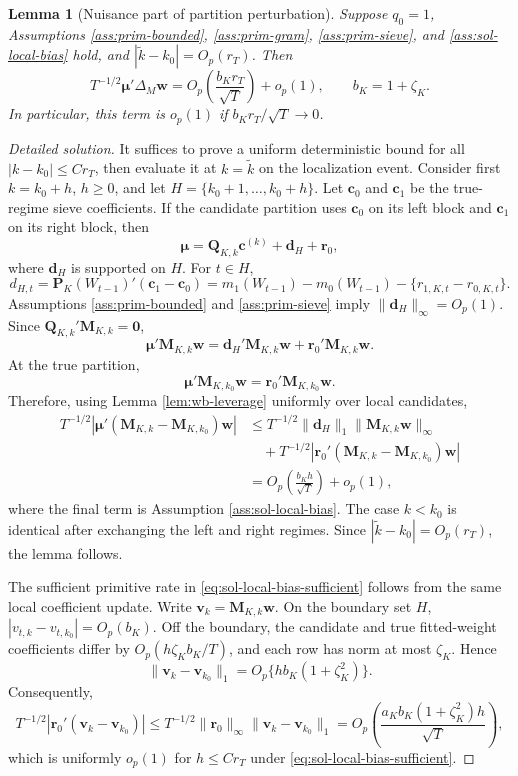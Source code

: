 \documentclass[12pt]{article}
\numberwithin{equation}{section}
\newtheorem{lemma}{Lemma}
\theoremstyle{definition}
\begin{document}
\begin{lemma}[Nuisance part of partition perturbation]
\label{lem:wb-bridge-mu}
Suppose \(q_0=1\), Assumptions \ref{ass:prim-bounded},
\ref{ass:prim-gram}, \ref{ass:prim-sieve}, and
\ref{ass:sol-local-bias} hold, and \(|\widetilde k-k_0|=O_p(r_T)\).  Then
\[
    T^{-1/2}\bm\mu'\Delta_M\bm w
    =
    O_p\!\left(\frac{b_Kr_T}{\sqrt T}\right)+o_p(1),
    \qquad b_K=1+\zeta_K.
\]
In particular, this term is \(o_p(1)\) if \(b_Kr_T/\sqrt T\to0\).
\end{lemma}


\begin{proof}[Detailed solution]
It suffices to prove a uniform deterministic bound for all
\(|k-k_0|\leq Cr_T\), then evaluate it at \(k=\widetilde k\) on the
localization event.  Consider first \(k=k_0+h\), \(h\geq0\), and let
\(H=\{k_0+1,\ldots,k_0+h\}\).  Let \(\bm c_0\) and \(\bm c_1\) be
the true-regime sieve coefficients.  If the candidate partition uses
\(\bm c_0\) on its left block and \(\bm c_1\) on its right block, then
\[
    \bm\mu=\bm Q_{K,k}\bm c^{(k)}+\bm d_H+\bm r_0,
\]
where \(\bm d_H\) is supported on \(H\).  For \(t\in H\),
\[
    d_{H,t}
    =\bm P_K(W_{t-1})'(\bm c_1-\bm c_0)
    =m_1(W_{t-1})-m_0(W_{t-1})-
      \{r_{1,K,t}-r_{0,K,t}\}.
\]
Assumptions \ref{ass:prim-bounded} and \ref{ass:prim-sieve} imply
\(\|\bm d_H\|_\infty=O_p(1)\).  Since
\(\bm Q_{K,k}'\bm M_{K,k}=\bm0\),
\[
    \bm\mu'\bm M_{K,k}\bm w
    =\bm d_H'\bm M_{K,k}\bm w
      +\bm r_0'\bm M_{K,k}\bm w.
\]
At the true partition,
\[
    \bm\mu'\bm M_{K,k_0}\bm w
    =\bm r_0'\bm M_{K,k_0}\bm w.
\]
Therefore, using Lemma \ref{lem:wb-leverage} uniformly over local candidates,
\begin{align*}
    T^{-1/2}|\bm\mu'(\bm M_{K,k}-\bm M_{K,k_0})\bm w|
    &\leq
      T^{-1/2}\|\bm d_H\|_1\|\bm M_{K,k}\bm w\|_\infty \\
    &\quad+
      T^{-1/2}|\bm r_0'(\bm M_{K,k}-\bm M_{K,k_0})\bm w| \\
    &=O_p\left(\frac{b_Kh}{\sqrt T}\right)+o_p(1),
\end{align*}
where the final term is Assumption \ref{ass:sol-local-bias}.  The case
\(k<k_0\) is identical after exchanging the left and right regimes.  Since
\(|\widetilde k-k_0|=O_p(r_T)\), the lemma follows.

The sufficient primitive rate in \eqref{eq:sol-local-bias-sufficient} follows
from the same local coefficient update.  Write \(\bm v_k=\bm M_{K,k}\bm w\).
On the boundary set \(H\), \(|v_{t,k}-v_{t,k_0}|=O_p(b_K)\).  Off the
boundary, the candidate and true fitted-weight coefficients differ by
\(O_p(h\zeta_Kb_K/T)\), and each row has norm at most \(\zeta_K\).  Hence
\[
    \|\bm v_k-\bm v_{k_0}\|_1
    =O_p\{h b_K(1+\zeta_K^2)\}.
\]
Consequently,
\[
    T^{-1/2}|\bm r_0'(\bm v_k-\bm v_{k_0})|
    \leq T^{-1/2}\|\bm r_0\|_\infty
       \|\bm v_k-\bm v_{k_0}\|_1
    =O_p\left(
       \frac{a_Kb_K(1+\zeta_K^2)h}{\sqrt T}
      \right),
\]
which is uniformly \(o_p(1)\) for \(h\leq Cr_T\) under
\eqref{eq:sol-local-bias-sufficient}.
\end{proof}
\end{document}
